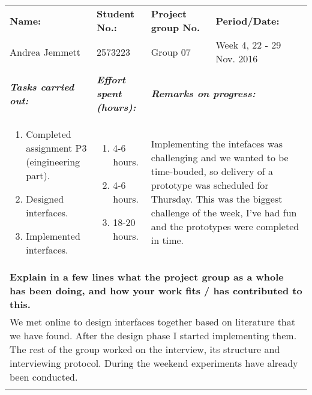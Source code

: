 \documentclass[a4paper]{article}
\begin{document}
\begin{center}
  \bgroup
  \def\arraystretch{1.5}
  \begin{tabular}{ | p{6cm} | p{6cm} | p{6cm} | p{6cm} | }
    \hline
    \textbf{Name:} &
    \textbf{Student No.:} &
    \textbf{Project group No.} &
    \textbf{Period/Date:} \\
    Andrea Jemmett &
    2573223 &
    Group 07 &
    Week 4, 22 - 29 Nov. 2016 \\
    \hline
    \rowcolor{yellow!25}\multicolumn{4}{|p{24cm}|}{\textbf{Past week:}} \\
    \hline
    \textbf{\textit{Tasks carried out:}} &
    \textbf{\textit{Effort spent (hours):}} &
    \multicolumn{2}{|l|}{\textbf{\textit{Remarks on progress:}}} \\
    \begin{enumerate}
      \vspace{-6mm}
      \item Completed assignment P3 (eingineering part).
      \item Designed interfaces.
      \item Implemented interfaces.
    \end{enumerate} &
    \begin{enumerate}
      \vspace{-6mm}
      \item 4-6 hours.
      \item 4-6 hours.
      \item 18-20 hours.
    \end{enumerate} &
    \multicolumn{2}{|p{12cm}|}{Implementing the intefaces was challenging and
    we wanted to be time-bouded, so delivery of a prototype was scheduled for
    Thursday. This was the biggest challenge of the week, I've had fun and the
    prototypes were completed in time.} \\
    \hline
    \multicolumn{4}{|p{24cm}|}{\textbf{Explain in a few lines what the project
    group as a whole has been doing, and how your work fits / has contributed
    to this.}} \\
    \multicolumn{4}{|p{24cm}|}{We met online to design interfaces together based
    on literature that we have found. After the design phase I started
    implementing them. The rest of the group worked on the interview, its
    structure and interviewing protocol. During the weekend experiments have
    already been conducted.} \\
    \hline
    \rowcolor{yellow!25}\multicolumn{4}{|p{24cm}|}{\textbf{Plan for the
}}
\end{tabular}
\end{center}
\end{document}
